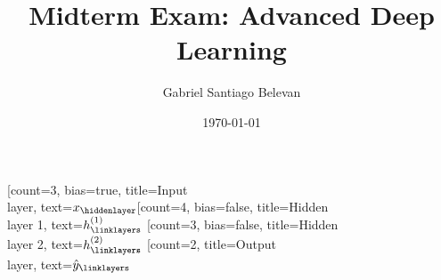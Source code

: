 \documentclass[12pt,a4paper]{article}
\title{Midterm Exam: Advanced Deep Learning}
\author[1]{Gabriel Santiago Belevan}
\date{\today}
\begin{document}
\maketitle

    \begin{neuralnetwork}[height=4]
        \newcommand{\x}[2]{$x_#2$}
        \newcommand{\y}[2]{$\hat{y}_#2$}
        \newcommand{\hfirst}[2]{\small $h^{(1)}_#2$}
        \newcommand{\hsecond}[2]{\small $h^{(2)}_#2$}
        [count=3, bias=true, title=Input\\layer, text=\x]
        \hiddenlayer[count=4, bias=false, title=Hidden\\layer 1, text=\hfirst] \linklayers
        \hiddenlayer[count=3, bias=false, title=Hidden\\layer 2, text=\hsecond] \linklayers
        \outputlayer[count=2, title=Output\\layer, text=\y] \linklayers
    \end{neuralnetwork}
\end{document}
